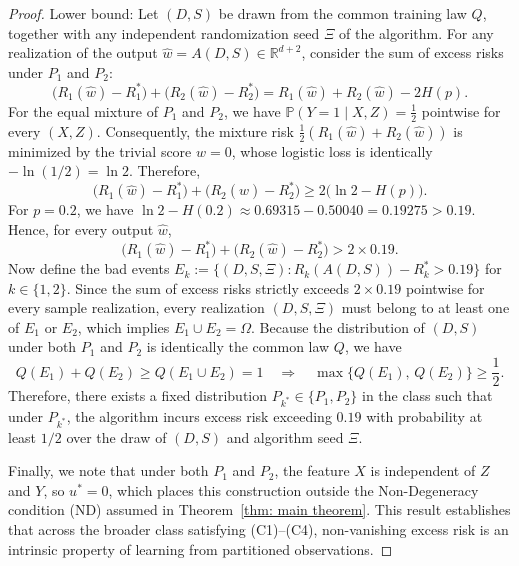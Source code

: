\begin{proof}
    \noindent Lower bound: Let $(D,S)$ be drawn from the common training law $Q$, together with any independent randomization seed $\Xi$ of the algorithm. For any realization of the output $\hat{w} = A(D,S) \in \mathbb{R}^{d+2}$, consider the sum of excess risks under $P_1$ and $P_2$:
    \begin{equation*}
        \big(R_1(\hat{w}) - R_1^*\big) + \big(R_2(\hat{w}) - R_2^*\big) = R_1(\hat{w}) + R_2(\hat{w}) - 2H(p).
    \end{equation*}
    For the equal mixture of $P_1$ and $P_2$, we have $\mathbb{P}(Y=1 \mid X, Z) = \tfrac{1}{2}$ pointwise for every $(X,Z)$. Consequently, the mixture risk $\tfrac{1}{2}(R_1(\hat{w}) + R_2(\hat{w}))$ is minimized by the trivial score $\hat{w} = 0$, whose logistic loss is identically $-\ln(1/2) = \ln 2$. Therefore,
    \begin{equation*}
        \big(R_1(\hat{w}) - R_1^*\big) + \big(R_2(\hat{w}) - R_2^*\big) \ge 2\big(\ln 2 - H(p)\big).
    \end{equation*}
    For $p = 0.2$, we have $\ln 2 - H(0.2) \approx 0.69315 - 0.50040 = 0.19275 > 0.19$. Hence, for every output $\hat{w}$,
    \begin{equation*}
        \big(R_1(\hat{w}) - R_1^*\big) + \big(R_2(\hat{w}) - R_2^*\big) > 2 \times 0.19.
    \end{equation*}
    Now define the bad events $E_k := \{(D, S, \Xi) : R_k(A(D,S)) - R_k^* > 0.19\}$ for $k \in \{1,2\}$. Since the sum of excess risks strictly exceeds $2 \times 0.19$ pointwise for every sample realization, every realization $(D,S,\Xi)$ must belong to at least one of $E_1$ or $E_2$, which implies $E_1 \cup E_2 = \Omega$. 
    Because the distribution of $(D,S)$ under both $P_1$ and $P_2$ is identically the common law $Q$, we have
    \begin{equation*}
        Q(E_1) + Q(E_2) \ge Q(E_1 \cup E_2) = 1 \quad\Longrightarrow\quad \max\{Q(E_1),\, Q(E_2)\} \ge \frac{1}{2}.
    \end{equation*}
    Therefore, there exists a fixed distribution $P_{k^*} \in \{P_1, P_2\}$ in the class such that under $P_{k^*}$, the algorithm incurs excess risk exceeding $0.19$ with probability at least $1/2$ over the draw of $(D,S)$ and algorithm seed $\Xi$.

    Finally, we note that under both $P_1$ and $P_2$, the feature $X$ is independent of $Z$ and $Y$, so $u^* = 0$, which places this construction outside the Non-Degeneracy condition (ND) assumed in Theorem~\ref{thm: main theorem}. This result establishes that across the broader class satisfying (C1)--(C4), non-vanishing excess risk is an intrinsic property of learning from partitioned observations.
\end{proof}
